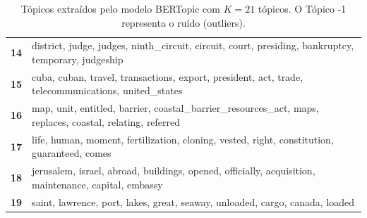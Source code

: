 \begin{table}[htpb]
\begin{tabularx}{\textwidth}{@{}l X@{}}
        \textbf{14} & district, judge, judges, ninth\_circuit, circuit, court, presiding, bankruptcy, temporary, judgeship \\
        \textbf{15} & cuba, cuban, travel, transactions, export, president, act, trade, telecommunications, united\_states \\
        \textbf{16} & map, unit, entitled, barrier, coastal\_barrier\_resources\_act, maps, replaces, coastal, relating, referred \\
        \textbf{17} & life, human, moment, fertilization, cloning, vested, right, constitution, guaranteed, comes \\
        \textbf{18} & jerusalem, israel, abroad, buildings, opened, officially, acquisition, maintenance, capital, embassy \\
        \textbf{19} & saint, lawrence, port, lakes, great, seaway, unloaded, cargo, canada, loaded \\
        \bottomrule
    \end{tabularx}
    \caption{Tópicos extraídos pelo modelo BERTopic com $K=21$ tópicos. O Tópico -1 representa o ruído (outliers).}
    \label{tab:topicos_bertopic_21}
\end{table}
